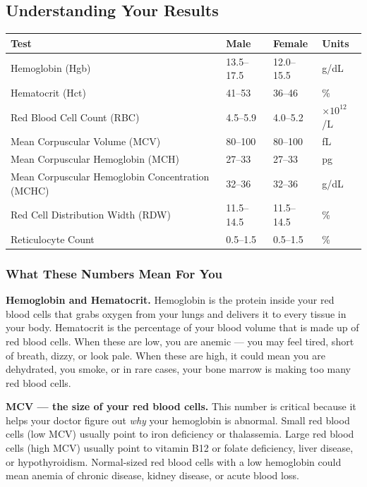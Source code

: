 \subsection{Understanding Your Results}

\begin{longtable}{@{}llll@{}}
\toprule
\textbf{Test} & \textbf{Male} & \textbf{Female} & \textbf{Units} \\
\midrule
\endhead
Hemoglobin (Hgb) & 13.5--17.5 & 12.0--15.5 & g/dL \\
Hematocrit (Hct) & 41--53 & 36--46 & \% \\
Red Blood Cell Count (RBC) & 4.5--5.9 & 4.0--5.2 & $\times 10^{12}$/L \\
Mean Corpuscular Volume (MCV) & 80--100 & 80--100 & fL \\
Mean Corpuscular Hemoglobin (MCH) & 27--33 & 27--33 & pg \\
Mean Corpuscular Hemoglobin Concentration (MCHC) & 32--36 & 32--36 & g/dL \\
Red Cell Distribution Width (RDW) & 11.5--14.5 & 11.5--14.5 & \% \\
Reticulocyte Count & 0.5--1.5 & 0.5--1.5 & \% \\
\bottomrule
\end{longtable}

\subsubsection{What These Numbers Mean For You}

\textbf{Hemoglobin and Hematocrit.} Hemoglobin is the protein inside your red blood cells that grabs oxygen from your lungs and delivers it to every tissue in your body. Hematocrit is the percentage of your blood volume that is made up of red blood cells. When these are low, you are anemic --- you may feel tired, short of breath, dizzy, or look pale. When these are high, it could mean you are dehydrated, you smoke, or in rare cases, your bone marrow is making too many red blood cells.

\textbf{MCV --- the size of your red blood cells.} This number is critical because it helps your doctor figure out \emph{why} your hemoglobin is abnormal. Small red blood cells (low MCV) usually point to iron deficiency or thalassemia. Large red blood cells (high MCV) usually point to vitamin B12 or folate deficiency, liver disease, or hypothyroidism. Normal-sized red blood cells with a low hemoglobin could mean anemia of chronic disease, kidney disease, or acute blood loss.

